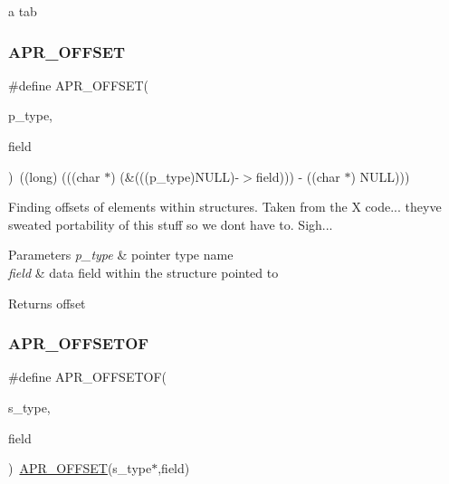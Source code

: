 a tab \mbox{\label{group__apr__general_ga41e537d6ad732766d12cd4eb61531678}} 
\subsubsection{\texorpdfstring{A\+P\+R\+\_\+\+O\+F\+F\+S\+ET}{APR\_OFFSET}}
{\footnotesize\ttfamily \#define A\+P\+R\+\_\+\+O\+F\+F\+S\+ET(\begin{DoxyParamCaption}\item[{}]{p\+\_\+type,  }\item[{}]{field }\end{DoxyParamCaption})~((long) (((char $\ast$) (\&(((p\+\_\+type)N\+U\+LL)-\/$>$field))) -\/ ((char $\ast$) N\+U\+LL)))}

Finding offsets of elements within structures. Taken from the X code... they\textquotesingle{}ve sweated portability of this stuff so we don\textquotesingle{}t have to. Sigh... 
\begin{DoxyParams}{Parameters}
{\em p\+\_\+type} & pointer type name \\
\hline
{\em field} & data field within the structure pointed to \\
\hline
\end{DoxyParams}
\begin{DoxyReturn}{Returns}
offset 
\end{DoxyReturn}
\mbox{\label{group__apr__general_gac16b1187b6ea63706c5dd48c88323dec}} 
\subsubsection{\texorpdfstring{A\+P\+R\+\_\+\+O\+F\+F\+S\+E\+T\+OF}{APR\_OFFSETOF}}
{\footnotesize\ttfamily \#define A\+P\+R\+\_\+\+O\+F\+F\+S\+E\+T\+OF(\begin{DoxyParamCaption}\item[{}]{s\+\_\+type,  }\item[{}]{field }\end{DoxyParamCaption})~\mbox{\hyperlink{group__apr__general_ga41e537d6ad732766d12cd4eb61531678}{A\+P\+R\+\_\+\+O\+F\+F\+S\+ET}}(s\+\_\+type$\ast$,field)}

